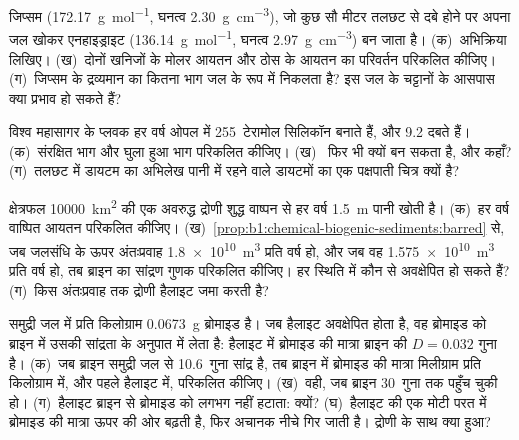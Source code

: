\begin{exercise}[$\star\star$]\label{exo:b1:chemical-biogenic-sediments:8}
जिप्सम  (\qty{172.17}{g.mol^{-1}}, घनत्व \qty{2.30}{g.cm^{-3}}), जो कुछ सौ मीटर तलछट से दबे होने पर अपना जल खोकर एनहाइड्राइट  (\qty{136.14}{g.mol^{-1}}, घनत्व \qty{2.97}{g.cm^{-3}}) बन जाता है। (क)~अभिक्रिया लिखिए। (ख)~दोनों खनिजों के मोलर आयतन और ठोस के आयतन का परिवर्तन परिकलित कीजिए। (ग)~जिप्सम के द्रव्यमान का कितना भाग जल के रूप में निकलता है? इस जल के चट्टानों के आसपास क्या प्रभाव हो सकते हैं?
\end{exercise}

\begin{exercise}[$\star\star$]\label{exo:b1:chemical-biogenic-sediments:9}
विश्व महासागर के प्लवक हर वर्ष ओपल में 255~टेरामोल सिलिकॉन बनाते हैं, और 9.2 दबते हैं। (क)~संरक्षित भाग और घुला हुआ भाग परिकलित कीजिए। (ख)~ फिर भी क्यों बन सकता है, और कहाँ? (ग)~तलछट में डायटम का अभिलेख पानी में रहने वाले डायटमों का एक पक्षपाती चित्र क्यों है?
\end{exercise}

\begin{exercise}[$\star\star\star$]\label{exo:b1:chemical-biogenic-sediments:10}
क्षेत्रफल \qty{10000}{km^2} की एक अवरुद्ध द्रोणी शुद्ध वाष्पन से हर वर्ष \qty{1.5}{m} पानी खोती है। (क)~हर वर्ष वाष्पित आयतन परिकलित कीजिए। (ख)~\cref{prop:b1:chemical-biogenic-sediments:barred} से, जब जलसंधि के ऊपर अंतःप्रवाह \qty{1.8e10}{m^3} प्रति वर्ष हो, और जब वह \qty{1.575e10}{m^3} प्रति वर्ष हो, तब ब्राइन का सांद्रण गुणक परिकलित कीजिए। हर स्थिति में कौन से  अवक्षेपित हो सकते हैं? (ग)~किस अंतःप्रवाह तक द्रोणी हैलाइट जमा करती है?
\end{exercise}

\begin{exercise}[$\star\star\star$]\label{exo:b1:chemical-biogenic-sediments:11}
समुद्री जल में प्रति किलोग्राम \qty{0.0673}{g} ब्रोमाइड है। जब हैलाइट अवक्षेपित होता है, वह ब्रोमाइड को ब्राइन में उसकी सांद्रता के अनुपात में लेता है: हैलाइट में ब्रोमाइड की मात्रा ब्राइन की $D = 0.032$ गुना है। (क)~जब ब्राइन समुद्री जल से 10.6~गुना सांद्र है, तब ब्राइन में ब्रोमाइड की मात्रा मिलीग्राम प्रति किलोग्राम में, और पहले हैलाइट में, परिकलित कीजिए। (ख)~वही, जब ब्राइन 30~गुना तक पहुँच चुकी हो। (ग)~हैलाइट ब्राइन से ब्रोमाइड को लगभग नहीं हटाता: क्यों? (घ)~हैलाइट की एक मोटी परत में ब्रोमाइड की मात्रा ऊपर की ओर बढ़ती है, फिर अचानक नीचे गिर जाती है। द्रोणी के साथ क्या हुआ?
\end{exercise}

